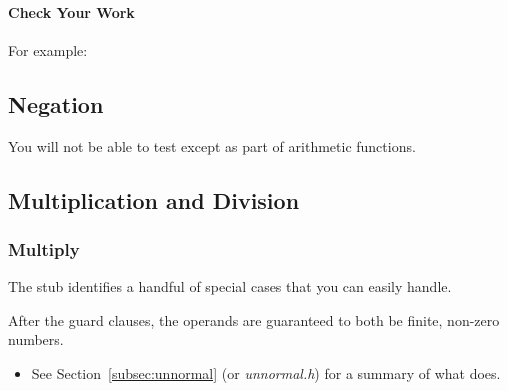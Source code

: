 \paragraph*{Check Your Work}

\begin{description}
\end{description}
For example:



\subsection{Negation}

\begin{description}
\end{description}

You will not be able to test  except as part of arithmetic functions.



\subsection{Multiplication and Division}

\subsubsection{Multiply}

The  stub identifies a handful of special cases that you can easily handle.
\begin{description}
\end{description}

After the guard clauses, the operands are guaranteed to both be finite, non-zero numbers.

\begin{description}
    \begin{itemize}
        \item See Section~\ref{subsec:unnormal} (or \textit{unnormal.h}) for a summary of what  does.
    \end{itemize}
\end{description}

